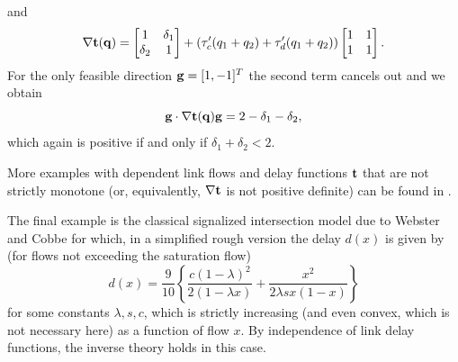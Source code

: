 \documentclass[a4paper,11pt]{article}
\begin{document}
and 
$$\nabla \bold{t(q)} = 
\begin{bmatrix}
1&\delta_1  \\
\delta_2 &1 
\end{bmatrix}
+ 
\left(\tau_c'(q_1+q_2) + \tau_d'(q_1+q_2)
\right)\begin{bmatrix}
1 & 1 \\
1 & 1
\end{bmatrix}.
$$
For the only feasible direction $\bold{g} = [1, -1]^T$ the second term cancels out and we obtain
\begin{equation*}
\bold{g} \cdot \nabla \bold{t(q)}\bold{g} = 2 - \delta_1 - \delta_2,
\end{equation*} 
which again is positive if and only if $\delta_1 + \delta_2 <2$. 

More examples with dependent link flows and delay functions $\bold{t}$ that are not strictly monotone (or, equivalently, $\nabla \bold{t}$ is not positive definite) can be found in \cite{BoylesBook}. 

The final example is the classical signalized intersection model due to Webster and Cobbe \cite{Webster} for which, in a simplified rough version the delay $d(x)$ is given by (for flows not exceeding the saturation flow)
\begin{equation*}
d(x) = \frac {9} {10} \left\{\frac {c(1-\lambda)^2}{2(1-\lambda x)} + \frac {x^2}{2\lambda s x(1-x)} \right\}
\end{equation*}
for some constants $\lambda, s, c$, which is strictly increasing (and even convex, which is not necessary here) as a function of flow $x$. By independence of link delay functions, the inverse theory holds in this case. 
\end{document}
